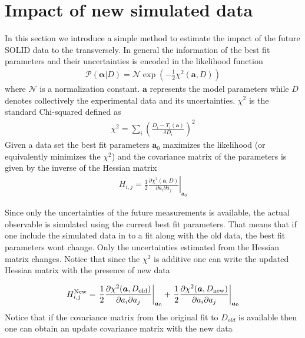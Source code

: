 \documentclass[twocolumn,showpacs,preprintnumbers,amsmath,amssymb,floatfix,prd]{revtex4}
\begin{document}
\section{Impact of new simulated data}
In this section we introduce a simple method to estimate the impact 
of the future SOLID data to the transversely. In general the
information of the best fit parameters and their uncertainties is
encoded in the likelihood function
%
\begin{align}
\mathcal{P}(\bm{\alpha}|D)
=\mathcal{N} \exp\left(-\frac{1}{2}\chi^2(\bm{a},D)\right)
\label{eq:likelihood}
\end{align}
%
where $\mathcal{N}$ is a normalization constant. $\bm{a}$ represents
the model parameters while $D$ denotes collectively the experimental data 
and its uncertainties. $\chi^2$ is the standard Chi-squared defined as
%
\begin{align}
\chi^2=\sum_i \left(\frac{D_i-T_i(\bm{a})}{\delta D_i}\right)^2
\label{eq:chi2}
\end{align}
%
Given a data set the best fit parameters $\bm{a}_0$ maximizes the likelihood (or
equivalently minimizes the $\chi^2$) and the covariance matrix of the
parameters is given by the inverse of the Hessian matrix 
%
\begin{align}
H_{i,j}=\left. \frac{1}{2}\frac{\partial\chi^2(\bm{a},D)}{\partial
a_i\partial a_j}
\right|_{\bm{a}_0}
\label{eq:H}
\end{align}
%

Since only the uncertainties of the future measurements is available,
the actual observable is simulated using the current best fit
parameters. That means that if one include the simulated data in to a
fit along with the old data, the best fit parameters wont change. Only
the uncertainties estimated from the Hessian matrix changes. Notice
that since the $\chi^2$ is additive one can write the updated Hessian
matrix with the presence of new data

%
\begin{align}
H^{\rm New}_{i,j}=
\left. \frac{1}{2}\frac{\partial\chi^2(\bm{a},D_{\rm old})}{\partial
a_i\partial a_j}
\right|_{\bm{a}_0}
+
\left. \frac{1}{2}\frac{\partial\chi^2(\bm{a},D_{\rm new})}{\partial
a_i\partial a_j}
\right|_{\bm{a}_0}
\label{eq:Hnew}
\end{align}
%
Notice that if the covariance matrix from the original fit to
$D_{old}$ is available then one can obtain an update covariance 
matrix with the new data
\end{document}
